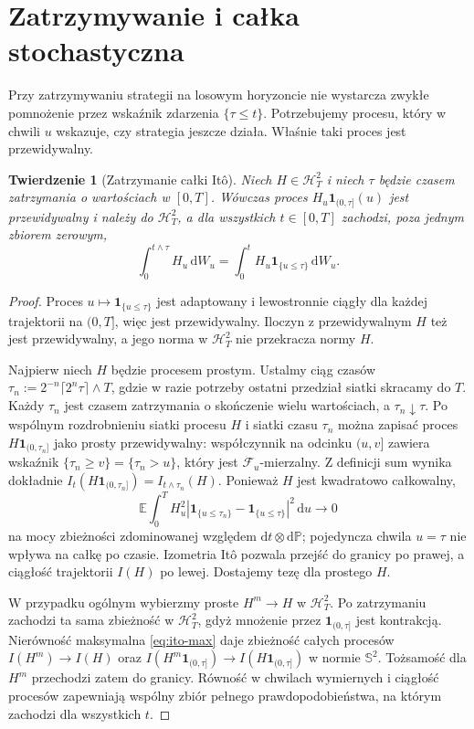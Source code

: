 \documentclass[11pt,a4paper,oneside]{report}
\numberwithin{equation}{chapter}
\theoremstyle{plain}
\newtheorem{twierdzenie}{Twierdzenie}[chapter]
\theoremstyle{definition}
\theoremstyle{remark}
\newcommand{\Prob}{\mathbb{P}}
\newcommand{\E}{\mathbb{E}}
\newcommand{\calF}{\mathcal{F}}
\newcommand{\calH}{\mathcal{H}}
\newcommand{\ind}[1]{\mathbf{1}_{#1}}
\newcommand{\dd}{\mathrm{d}}
\begin{document}
\section{Zatrzymywanie i całka stochastyczna}
Przy zatrzymywaniu strategii na losowym horyzoncie nie
wystarcza zwykłe pomnożenie przez wskaźnik zdarzenia
$\{\tau\le t\}$. Potrzebujemy procesu, który w chwili $u$
wskazuje, czy strategia jeszcze działa. Właśnie taki proces
jest przewidywalny.

\begin{twierdzenie}[Zatrzymanie całki Itô]\label{th:ito-stopping}
Niech $H\in\calH_T^2$ i niech $\tau$ będzie czasem
zatrzymania o wartościach w $[0,T]$. Wówczas proces
$H_u\ind{(0,\tau]}(u)$ jest przewidywalny i należy
do $\calH_T^2$, a dla wszystkich $t\in[0,T]$
zachodzi, poza jednym zbiorem zerowym,
\[
\int_0^{t\wedge\tau}H_u\,\dd W_u
=\int_0^t H_u\ind{\{u\le\tau\}}\,\dd W_u.
\tag{2.11}\label{eq:stopped-ito}
\]
\end{twierdzenie}
\begin{proof}
Proces $u\mapsto\ind{\{u\le\tau\}}$ jest adaptowany
i lewostronnie ciągły dla każdej trajektorii na $(0,T]$,
więc jest przewidywalny. Iloczyn z przewidywalnym $H$
też jest przewidywalny, a jego norma w $\calH_T^2$
nie przekracza normy $H$.

Najpierw niech $H$ będzie procesem prostym. Ustalmy
ciąg czasów $\tau_n:=2^{-n}\lceil2^n\tau\rceil\wedge T$,
gdzie w razie potrzeby ostatni przedział siatki skracamy
do $T$. Każdy $\tau_n$ jest czasem zatrzymania o skończenie
wielu wartościach, a $\tau_n\downarrow\tau$.
Po wspólnym rozdrobnieniu siatki procesu $H$ i siatki
czasu $\tau_n$ można zapisać proces
$H\ind{(0,\tau_n]}$ jako prosty przewidywalny:
współczynnik na odcinku $(u,v]$ zawiera wskaźnik
$\{\tau_n\ge v\}=\{\tau_n>u\}$, który jest
$\calF_u$-mierzalny. Z definicji sum wynika dokładnie
$I_t(H\ind{(0,\tau_n]})=I_{t\wedge\tau_n}(H)$.
Ponieważ $H$ jest kwadratowo całkowalny,
\[
\E\int_0^T H_u^2
|\ind{\{u\le\tau_n\}}-\ind{\{u\le\tau\}}|^2\,\dd u
\longrightarrow0
\]
na mocy zbieżności zdominowanej względem
$\dd t\otimes\dd\Prob$; pojedyncza chwila $u=\tau$
nie wpływa na całkę po czasie. Izometria Itô pozwala
przejść do granicy po prawej, a ciągłość trajektorii
$I(H)$ po lewej. Dostajemy tezę dla prostego $H$.

W przypadku ogólnym wybierzmy proste $H^m\to H$
w $\calH_T^2$. Po zatrzymaniu zachodzi ta sama
zbieżność w $\calH_T^2$, gdyż mnożenie przez
$\ind{(0,\tau]}$ jest kontrakcją.
Nierówność maksymalna \eqref{eq:ito-max} daje zbieżność
całych procesów $I(H^m)\to I(H)$ oraz
$I(H^m\ind{(0,\tau]})\to I(H\ind{(0,\tau]})$
w normie $\mathbb S^2$. Tożsamość dla $H^m$
przechodzi zatem do granicy. Równość w chwilach wymiernych
i ciągłość procesów zapewniają wspólny zbiór pełnego
prawdopodobieństwa, na którym zachodzi dla wszystkich $t$.
\end{proof}
\end{document}
